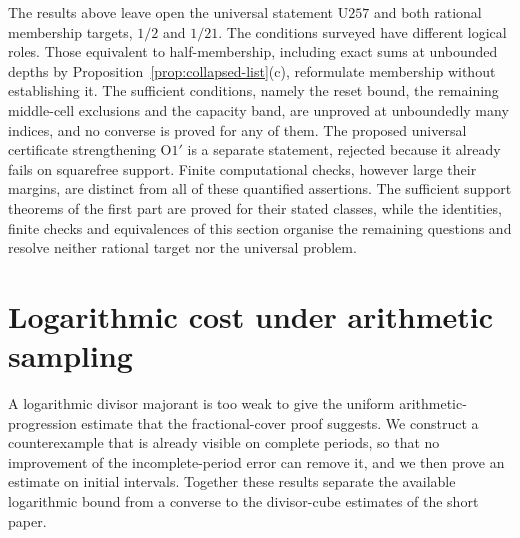The results above leave open the universal statement
$\mathrm{U257}$ and both rational membership targets, $1/2$ and
$1/21$.  The conditions surveyed have different logical roles.
Those equivalent to half-membership, including exact sums at unbounded
depths by Proposition~\ref{prop:collapsed-list}(c), reformulate
membership without establishing it.  The sufficient conditions, namely the
reset bound, the remaining middle-cell exclusions and the capacity band,
are unproved at unboundedly many indices, and
no converse is proved for any of them.  The proposed universal certificate
strengthening $\mathrm{O1'}$ is a separate statement, rejected because it
already fails on squarefree support.  Finite computational checks,
however large their margins, are distinct from all of these quantified
assertions. The sufficient support theorems of the first part are proved for their
stated classes, while the identities, finite checks and equivalences of this
section organise the remaining questions and resolve neither
rational target nor the universal problem.

\clearpage
\section{Logarithmic cost under arithmetic sampling}\label{sec:257-logarithmic-sampling}
A logarithmic divisor majorant is too weak to give the uniform
arithmetic-progression estimate that the fractional-cover proof suggests.
We construct a counterexample that is already visible on complete periods, so
that no improvement of the incomplete-period error can remove it, and we then
prove an estimate on initial intervals. Together these results separate the
available logarithmic bound from a converse to the divisor-cube estimates of
the short paper.

